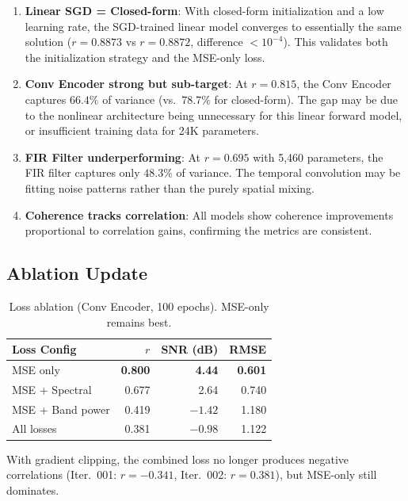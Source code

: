 \documentclass[11pt,a4paper]{article}
\begin{document}
\begin{enumerate}
  \item \textbf{Linear SGD = Closed-form}: With closed-form initialization and
    a low learning rate, the SGD-trained linear model converges to essentially
    the same solution ($r=0.8873$ vs $r=0.8872$, difference $< 10^{-4}$).
    This validates both the initialization strategy and the MSE-only loss.

  \item \textbf{Conv Encoder strong but sub-target}: At $r=0.815$, the Conv
    Encoder captures $66.4\%$ of variance (vs.\ $78.7\%$ for closed-form).
    The gap may be due to the nonlinear architecture being unnecessary for this
    linear forward model, or insufficient training data for 24K parameters.

  \item \textbf{FIR Filter underperforming}: At $r=0.695$ with 5,460 parameters,
    the FIR filter captures only $48.3\%$ of variance. The temporal convolution
    may be fitting noise patterns rather than the purely spatial mixing.

  \item \textbf{Coherence tracks correlation}: All models show coherence
    improvements proportional to correlation gains, confirming the metrics
    are consistent.
\end{enumerate}

\subsection{Ablation Update}

\begin{table}[H]
\centering
\caption{Loss ablation (Conv Encoder, 100 epochs). MSE-only remains best.}
\label{tab:ablation_loss}
\begin{tabular}{lrrr}
\toprule
Loss Config & $r$ & SNR (dB) & RMSE \\
\midrule
MSE only & \textbf{0.800} & \textbf{4.44} & \textbf{0.601} \\
MSE + Spectral & 0.677 & 2.64 & 0.740 \\
MSE + Band power & 0.419 & $-1.42$ & 1.180 \\
All losses & 0.381 & $-0.98$ & 1.122 \\
\bottomrule
\end{tabular}
\end{table}

With gradient clipping, the combined loss no longer produces negative correlations
(Iter.~001: $r=-0.341$, Iter.~002: $r=0.381$), but MSE-only still dominates.
\end{document}
